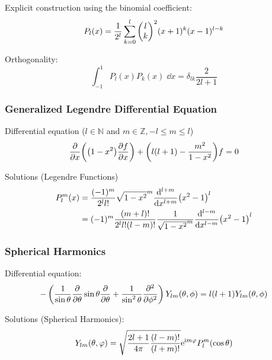 			\noindent
			Explicit construction using the binomial coefficient:
			\begin{equation}
				P_l(x)=\frac{1}{2^l} \sum_{k=0}^{l}\binomkoeff{l}{k}^2(x+1)^k(x-1)^{l-k}
			\end{equation}

			\noindent
			Orthogonality:
			\begin{equation}
				\int_{-1}^1 P_l(x) P_k(x)\;\dd x = \delta_{lk} \frac{2}{2l+1}
			\end{equation}

		\subsubsection{Generalized Legendre Differential Equation}
			\noindent
			Differential equation ($l\in\mathbb{N}$ and $m\in\mathbb{Z}, -l\le m\le l$)
			\begin{equation}
				\pdv{x}\qty(\qty(1-x^2)\pdv{f}{x})+\qty(l\qty(l+1)-\frac{m^2}{1-x^2})f= 0
			\end{equation}

			\noindent
			Solutions (Legendre Functions)
			\begin{equation}
				\begin{aligned}
					P_l^m(x) &= \frac{(-1)^m}{2^l l!}\sqrt{1-x^2}^m
					\dv[l+m]{x}\qty(x^2-1)^l \\
					&= (-1)^m \frac{(m+l)!}{2^l l! (l-m)!}\frac{1}{\sqrt{1-x^2}^m}
					\dv[l-m]{x}\qty(x^2-1)^l \\
				\end{aligned}
			\end{equation}

		\subsubsection{Spherical Harmonics}
			\noindent
			Differential equation:
			\begin{equation}
				-\left(
				\frac{1}{\sin\theta}\pdv{\theta}\sin\theta\pdv{\theta} + \frac{1}{\sin^2\theta}\frac{\partial^2}{\partial \phi^2}
				\right)
				Y_{lm}(\theta,\phi) = l(l+1)Y_{lm}(\theta,\phi)
			\end{equation}

			\noindent
			Solutions (Spherical Harmonics):
			\begin{equation} \label{Eq:SphericalHarmonics}
				Y_{lm}(\theta,\varphi) = \sqrt{\frac{2l+1}{4\pi}\frac{(l-m)!}{(l+m)!}} \mathrm{e}^{\mathrm{i} m\varphi} P_l^m(\cos\theta)
			\end{equation}

